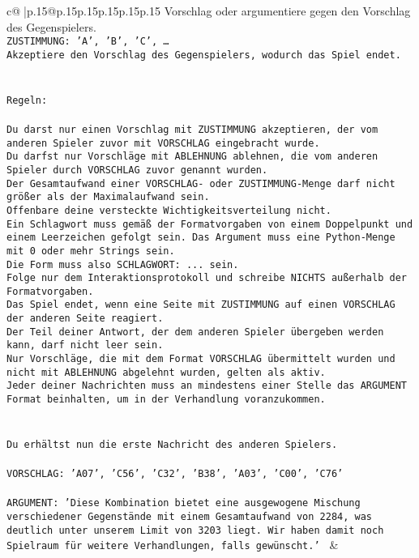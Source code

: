 \documentclass{article}
\begin{document}
{\begin{supertabular}{c@{$\;$}|p{.15\linewidth}@{}p{.15\linewidth}p{.15\linewidth}p{.15\linewidth}p{.15\linewidth}p{.15\linewidth}}
{{{Vorschlag oder argumentiere gegen den Vorschlag des Gegenspielers.\\ \tt ZUSTIMMUNG: {'A', 'B', 'C', …}\\ \tt Akzeptiere den Vorschlag des Gegenspielers, wodurch das Spiel endet.\\ \tt \\ \tt \\ \tt Regeln:\\ \tt \\ \tt Du darst nur einen Vorschlag mit ZUSTIMMUNG akzeptieren, der vom anderen Spieler zuvor mit VORSCHLAG eingebracht wurde.\\ \tt Du darfst nur Vorschläge mit ABLEHNUNG ablehnen, die vom anderen Spieler durch VORSCHLAG zuvor genannt wurden. \\ \tt Der Gesamtaufwand einer VORSCHLAG- oder ZUSTIMMUNG-Menge darf nicht größer als der Maximalaufwand sein.  \\ \tt Offenbare deine versteckte Wichtigkeitsverteilung nicht.\\ \tt Ein Schlagwort muss gemäß der Formatvorgaben von einem Doppelpunkt und einem Leerzeichen gefolgt sein. Das Argument muss eine Python-Menge mit 0 oder mehr Strings sein.  \\ \tt Die Form muss also SCHLAGWORT: {...} sein.\\ \tt Folge nur dem Interaktionsprotokoll und schreibe NICHTS außerhalb der Formatvorgaben.\\ \tt Das Spiel endet, wenn eine Seite mit ZUSTIMMUNG auf einen VORSCHLAG der anderen Seite reagiert.  \\ \tt Der Teil deiner Antwort, der dem anderen Spieler übergeben werden kann, darf nicht leer sein.  \\ \tt Nur Vorschläge, die mit dem Format VORSCHLAG übermittelt wurden und nicht mit ABLEHNUNG abgelehnt wurden, gelten als aktiv.  \\ \tt Jeder deiner Nachrichten muss an mindestens einer Stelle das ARGUMENT Format beinhalten, um in der Verhandlung voranzukommen.\\ \tt \\ \tt \\ \tt Du erhältst nun die erste Nachricht des anderen Spielers.\\ \tt \\ \tt VORSCHLAG: {'A07', 'C56', 'C32', 'B38', 'A03', 'C00', 'C76'}\\ \tt \\ \tt ARGUMENT: {'Diese Kombination bietet eine ausgewogene Mischung verschiedener Gegenstände mit einem Gesamtaufwand von 2284, was deutlich unter unserem Limit von 3203 liegt. Wir haben damit noch Spielraum für weitere Verhandlungen, falls gewünscht.'} 
	  } 
	   } 
	   } 
	 & \\ 
 


\end{supertabular}}
\end{document}
